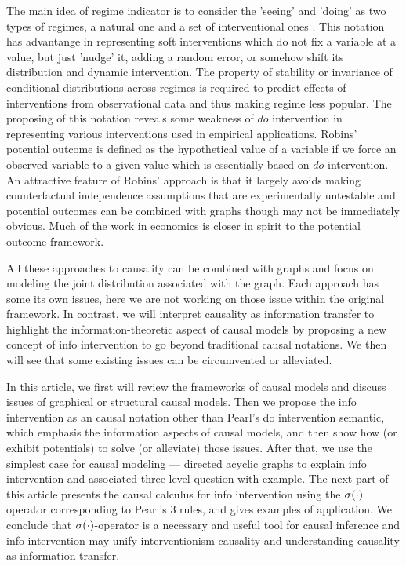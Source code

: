 The main idea of regime indicator is to consider the 'seeing' and 'doing' as two types of regimes, a natural one and a set of interventional ones \cite{dawid2015statistical}. This notation has advantange in representing soft interventions  which do not fix a variable at a value, but just 'nudge' it, adding a random error, or somehow shift its distribution \cite{eberhardt2007interventions} and dynamic intervention.  The property of stability \cite{dawid2010identifying} or invariance \cite{hausman1999independence} of conditional distributions across regimes is required to predict effects of interventions from observational data and thus making regime less popular. The proposing of this notation reveals some weakness of $do$ intervention in representing various interventions used in empirical applications. Robins' potential outcome is defined as the hypothetical value of a variable if we force an observed variable to a given value which is essentially based on $do$ intervention. An attractive feature of Robins' approach is that it largely avoids making counterfactual independence assumptions that are experimentally untestable and potential outcomes can be combined with graphs though may not be immediately obvious\cite{Richardson2011, richardson2013single, Marloes2018}.  Much of the  work in economics is closer in spirit to the potential outcome framework\cite{Imbens2019}. 

 

All these approaches to causality can be combined with graphs and focus on modeling the joint distribution associated with the graph. Each approach has some its own issues,  here we are not working on those issue within the original framework. In contrast,  we will interpret causality as information transfer to highlight the information-theoretic aspect of causal models  by proposing a new concept of info intervention to go beyond traditional causal notations. We then will see that some existing issues  can be circumvented or alleviated. 

  
In this article, we first will review the frameworks of causal models and discuss issues of graphical or structural causal models. Then we propose the info intervention as an causal notation other than Pearl’s do intervention semantic, which emphasis the information aspects of causal models, and then show how (or exhibit potentials) to solve (or alleviate) those issues. After that, we use the simplest case for causal modeling --- directed acyclic graphs to explain info intervention and associated three-level question with example. The next part of this article presents the causal calculus for info intervention using the $\mathrm{\sigma}(\cdot)$ operator corresponding to Pearl's 3 rules, and gives examples of application. We conclude that $\mathrm{\sigma}(\cdot)$-operator is a necessary and useful tool for causal inference and info intervention may unify interventionism causality and understanding causality as information transfer.


